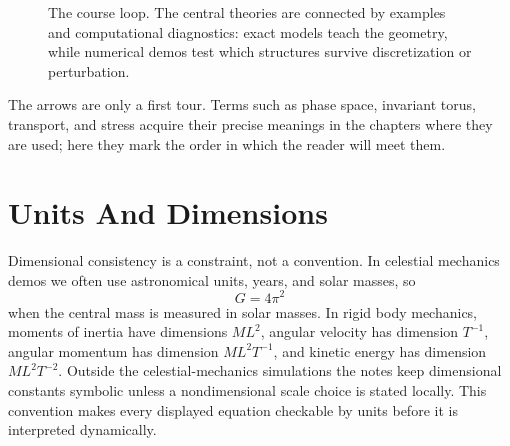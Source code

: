 \begin{figure}[htbp]
\centering
{}
\caption{The course loop. The central theories are connected by examples and
computational diagnostics: exact models teach the geometry, while numerical
demos test which structures survive discretization or perturbation.}
\label{fig:course-loop}
\end{figure}

The arrows are only a first tour. Terms such as phase space, invariant torus,
transport, and stress acquire their precise meanings in the chapters where they
are used; here they mark the order in which the reader will meet them.

\section{Units And Dimensions}
\label{sec:units-dimensions}

Dimensional consistency is a constraint, not a convention. In celestial
mechanics demos we often use astronomical units, years, and solar masses, so
\[
  G = 4\pi^2
\]
when the central mass is measured in solar masses. In rigid body mechanics,
moments of inertia have dimensions \(ML^2\), angular velocity has dimension
\(T^{-1}\), angular momentum has dimension \(ML^2T^{-1}\), and kinetic energy
has dimension \(ML^2T^{-2}\). Outside the celestial-mechanics simulations the
notes keep dimensional constants symbolic unless a nondimensional scale choice
is stated locally. This convention makes every displayed equation checkable by
units before it is interpreted dynamically.

